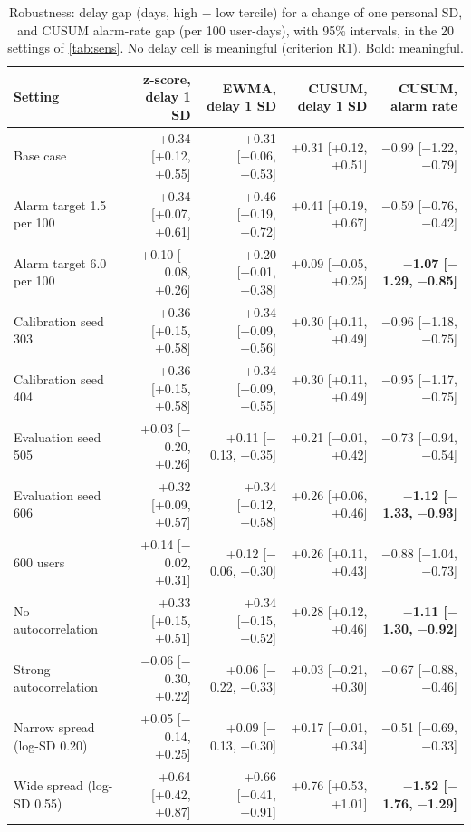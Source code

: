 \begin{table}[!htbp]
\centering
\scriptsize
\setlength{\tabcolsep}{3.0pt}
\caption{Robustness: delay gap (days, high $-$ low tercile) for a change of one personal SD, and CUSUM alarm-rate gap (per 100 user-days), with 95\% intervals, in the 20 settings of \cref{tab:sens}. No delay cell is meaningful (criterion R1). Bold: meaningful.}
\label{tab:sens_ci_a}
\begin{tabular}{@{}p{4.6cm}rrrr@{}}
\toprule
Setting & z-score, delay 1 SD & EWMA, delay 1 SD & CUSUM, delay 1 SD & CUSUM, alarm rate \\
\midrule
Base case & +0.34 [+0.12, +0.55] & +0.31 [+0.06, +0.53] & +0.31 [+0.12, +0.51] & $-$0.99 [$-$1.22, $-$0.79] \\
Alarm target 1.5 per 100 & +0.34 [+0.07, +0.61] & +0.46 [+0.19, +0.72] & +0.41 [+0.19, +0.67] & $-$0.59 [$-$0.76, $-$0.42] \\
Alarm target 6.0 per 100 & +0.10 [$-$0.08, +0.26] & +0.20 [+0.01, +0.38] & +0.09 [$-$0.05, +0.25] & \textbf{$-$1.07 [$-$1.29, $-$0.85]} \\
Calibration seed 303 & +0.36 [+0.15, +0.58] & +0.34 [+0.09, +0.56] & +0.30 [+0.11, +0.49] & $-$0.96 [$-$1.18, $-$0.75] \\
Calibration seed 404 & +0.36 [+0.15, +0.58] & +0.34 [+0.09, +0.55] & +0.30 [+0.11, +0.49] & $-$0.95 [$-$1.17, $-$0.75] \\
Evaluation seed 505 & +0.03 [$-$0.20, +0.26] & +0.11 [$-$0.13, +0.35] & +0.21 [$-$0.01, +0.42] & $-$0.73 [$-$0.94, $-$0.54] \\
Evaluation seed 606 & +0.32 [+0.09, +0.57] & +0.34 [+0.12, +0.58] & +0.26 [+0.06, +0.46] & \textbf{$-$1.12 [$-$1.33, $-$0.93]} \\
600 users & +0.14 [$-$0.02, +0.31] & +0.12 [$-$0.06, +0.30] & +0.26 [+0.11, +0.43] & $-$0.88 [$-$1.04, $-$0.73] \\
No autocorrelation & +0.33 [+0.15, +0.51] & +0.34 [+0.15, +0.52] & +0.28 [+0.12, +0.46] & \textbf{$-$1.11 [$-$1.30, $-$0.92]} \\
Strong autocorrelation & $-$0.06 [$-$0.30, +0.22] & +0.06 [$-$0.22, +0.33] & +0.03 [$-$0.21, +0.30] & $-$0.67 [$-$0.88, $-$0.46] \\
Narrow spread (log-SD 0.20) & +0.05 [$-$0.14, +0.25] & +0.09 [$-$0.13, +0.30] & +0.17 [$-$0.01, +0.34] & $-$0.51 [$-$0.69, $-$0.33] \\
Wide spread (log-SD 0.55) & +0.64 [+0.42, +0.87] & +0.66 [+0.41, +0.91] & +0.76 [+0.53, +1.01] & \textbf{$-$1.52 [$-$1.76, $-$1.29]} \\

\end{tabular}
\end{table}
